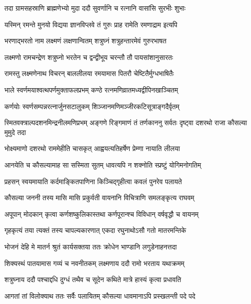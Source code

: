 \twolineshloka
{तदा ग्रामसहस्राणि ब्राह्मणेभ्यो मुदा ददौ}
{सुवर्णानि च रत्नानि वासांसि सुरभीः शुभाः} %

\twolineshloka
{यस्मिन् रमन्ते मुनयो विद्यया ज्ञानविप्लवे}
{तं गुरुः प्राह रामेति रमणाद्राम इत्यपि} %

\twolineshloka
{भरणाद्भरतो नाम लक्ष्मणं लक्षणान्वितम्}
{शत्रुघ्नं शत्रुहन्तारमेवं गुरुरभाषत} %

\twolineshloka
{लक्ष्मणो रामचन्द्रेण शत्रुघ्नो भरतेन च}
{द्वन्द्वीभूय चरन्तौ तौ पायसांशानुसारतः} %

\twolineshloka
{रामस्तु लक्ष्मणेनाथ विचरन् बाललीलया}
{रमयामास पितरौ चेष्टितैर्मुग्धभाषितैः} %

\twolineshloka
{भाले स्वर्णमयाश्वत्थपर्णमुक्ताफलप्रभम्}
{कण्ठे रत्नमणिव्रातमध्यद्वीपिनखाञ्चितम्} %

\twolineshloka
{कर्णयोः स्वर्णसम्पन्नरत्नार्जुनसटालुकम्}
{शिञ्जानमणिमञ्जीरकटिसूत्राङ्गदैर्वृतम्} %

\threelineshloka
{स्मितवक्त्राल्पदशनमिन्द्रनीलमणिप्रभम्}
{अङ्गणे रिङ्गमाणं तं तर्णकाननु सर्वतः}
{दृष्ट्वा दशरथो राजा कौसल्या मुमुदे तदा} %

\twolineshloka
{भोक्ष्यमाणो दशरथो राममेहीति चासकृत्}
{आह्वयत्यतिहर्षेण प्रेम्णा नायाति लीलया} %

\twolineshloka
{आनयेति च कौसल्यामाह सा सस्मिता सुतम्}
{धावत्यपि न शक्नोति स्प्रष्टुं योगिमनोगतिम्} %

\twolineshloka
{प्रहसन् स्वयमायाति कर्दमाङ्कितपाणिना}
{किञ्चिद्गृहीत्वा कवलं पुनरेव पलायते} %

\twolineshloka
{कौसल्या जननी तस्य मासि मासि प्रकुर्वती}
{वायनानि विचित्राणि समलङ्कृत्य राघवम्} %

\twolineshloka
{अपूपान् मोदकान् कृत्वा कर्णशष्कुलिकास्तथा}
{कर्णपूरान्श्च विविधान् वर्षवृद्धौ च वायनम्} %

\twolineshloka
{गृहकृत्यं तया त्यक्तं तस्य चापल्यकारणात्}
{एकदा रघुनाथोऽसौ गतो मातरमन्तिके} %

\twolineshloka
{भोजनं देहि मे मातर्न श्रुतं कार्यसक्तया}
{ततः क्रोधेन भाण्डानि लगुडेनाहनत्तदा} %

\twolineshloka
{शिक्यस्थं पातयामास गव्यं च नवनीतकम्}
{लक्ष्मणाय ददौ रामो भरताय यथाक्रमम्} %

\twolineshloka
{शत्रुघ्नाय ददौ पश्चाद्दधि दुग्धं तथैव च}
{सूदेन कथिते मात्रे हास्यं कृत्वा प्रधावति} %

\twolineshloka
{आगतां तां विलोक्याथ ततः सर्वैः पलायितम्}
{कौसल्या धावमानाऽपि प्रस्खलन्ती पदे पदे} %

